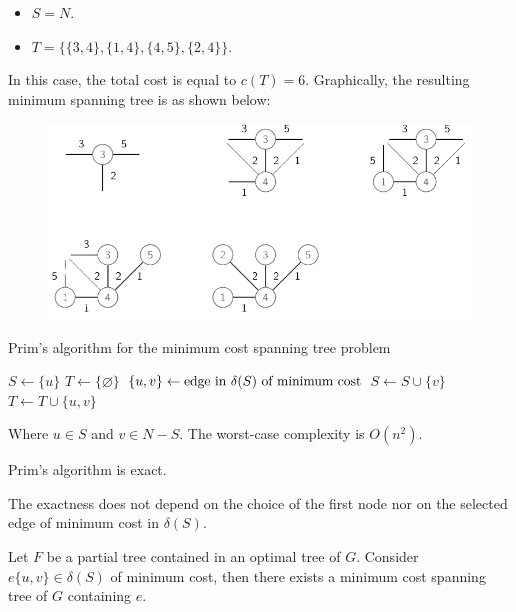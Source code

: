 \documentclass[12pt, a4paper]{report}
\begin{document}
\begin{example}
\begin{itemize}
            \begin{itemize}
                \item $S=N$.
                \item $T=\{\{3,4\},\{1,4\},\{4,5\},\{2,4\}\}$.
            \end{itemize}
        \end{itemize}
        In this case, the total cost is equal to $c(T)=6$. 
        Graphically, the resulting minimum spanning tree is as shown below:
        \begin{figure}[H]
            \centering
            \includegraphics[width=0.75\linewidth]{images/MST.png}
        \end{figure}
    \end{example}
    \begin{algorithm}[H]
        \caption{Prim's algorithm for the minimum cost spanning tree problem}
            \begin{algorithmic}[1]
                \State $S \leftarrow \{u\}$
                \State $T \leftarrow \{\varnothing\}$
                    \State $\{u,v\}\leftarrow \textnormal{edge in } \delta(S) \textnormal{ of minimum cost}$
                    \State $S \leftarrow S \cup \{v\}$
                    \State $T \leftarrow T \cup \{u,v\}$
                \EndWhile
            \end{algorithmic}
    \end{algorithm}
    Where $u \in S$ and $v \in N-S$. 
    The worst-case complexity is $O(n^2)$. 
    \newpage
    \begin{proposition}
        Prim's algorithm is exact. 
    \end{proposition}        
    The exactness does not depend on the choice of the first node nor on the selected edge of minimum cost in $\delta(S)$. 
    \begin{property}
        Let $F$ be a partial tree contained in an optimal tree of $G$. 
        Consider $e\{u,v\}\in \delta(S)$ of minimum cost, then there exists a minimum cost spanning tree of $G$ containing $e$. 
    \end{property}
\end{document}
